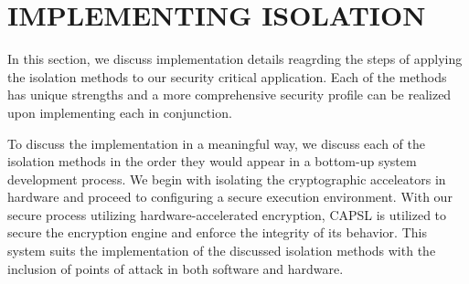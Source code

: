 \documentclass[sigconf]{acmart}
\theoremstyle{plain}
\theoremstyle{remark}
\begin{document}
%
%
%
%





\section{IMPLEMENTING ISOLATION} \label{sec:Implementation}
In this section, we discuss implementation details reagrding the steps of applying the isolation methods to our security critical application. Each of the methods has unique strengths and a more comprehensive security profile can be realized upon implementing each in conjunction.

To discuss the implementation in a meaningful way, we discuss each of the isolation methods in the order they would appear in a bottom-up system development process. We begin with isolating the cryptographic acceleators in hardware and proceed to configuring a secure execution environment. With our secure process utilizing hardware-accelerated encryption, CAPSL is utilized to secure the encryption engine and enforce the integrity of its behavior. This system suits the implementation of the discussed isolation methods with the inclusion of points of attack in both software and hardware.
\end{document}
